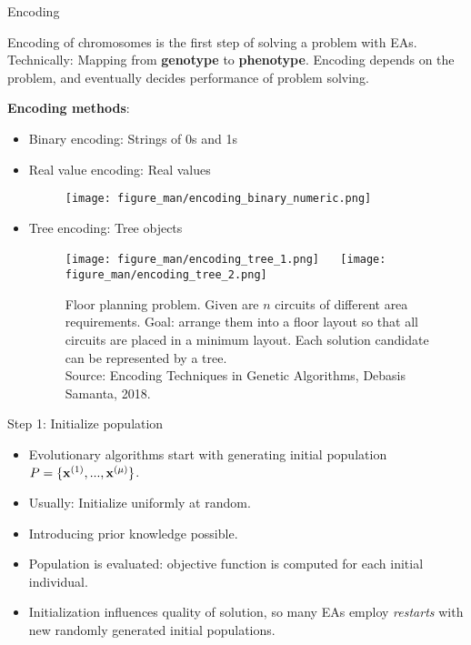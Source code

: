\documentclass[11pt,compress,t,notes=noshow, xcolor=table]{beamer}
\begin{document}
\begin{vbframe}{Encoding}

Encoding of chromosomes is the first step of solving a problem with EAs.  Technically: Mapping from \textbf{genotype} to \textbf{phenotype}. Encoding depends on the problem, and eventually decides performance of problem solving. 

\lz 

\textbf{Encoding methods}: 
\begin{itemize}
  \item Binary encoding: Strings of 0s and 1s 
  \item Real value encoding: Real values 

  \begin{figure}
    \texttt{[image: figure\_man/encoding\_binary\_numeric.png]}
  \end{figure}
  \item Tree encoding: Tree objects 
  \begin{figure}
    \texttt{[image: figure\_man/encoding\_tree\_1.png]} ~~ \texttt{[image: figure\_man/encoding\_tree\_2.png]} \\
    \begin{footnotesize}
      Floor planning problem. Given are $n$ circuits of different area requirements. Goal: arrange them into a floor layout so that all circuits are placed in a minimum layout. Each solution candidate can be represented by a tree. \\ 
      Source: Encoding Techniques in Genetic Algorithms, Debasis Samanta, 2018. \\
    \end{footnotesize}
  \end{figure}
\end{itemize}

\end{vbframe}

\begin{vbframe}{Step 1: Initialize population}
    \begin{itemize}
            \item Evolutionary algorithms start with generating initial population $P = \{\mathbf{x}^{(1)}, ..., \mathbf{x}^{(\mu)}\}$.
            \item Usually: Initialize uniformly at random.
            \item Introducing prior knowledge possible.
            \item Population is evaluated: objective function is computed for each initial individual.
            \item Initialization influences quality of solution, so many EAs employ \textit{restarts} with new randomly generated initial populations.
    \end{itemize}
\end{vbframe}
\end{document}
